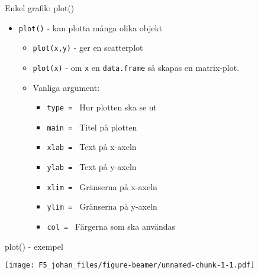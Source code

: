 \documentclass[
  11pt,
  ignorenonframetext,
  handout]{beamer}
\newenvironment{Shaded}{\begin{snugshade}}{\end{snugshade}}
\newcommand{\AttributeTok}[1]{\textcolor[rgb]{0.13,0.29,0.53}{#1}}
\newcommand{\FunctionTok}[1]{\textcolor[rgb]{0.13,0.29,0.53}{\textbf{#1}}}
\newcommand{\NormalTok}[1]{#1}
\newcommand{\SpecialCharTok}[1]{\textcolor[rgb]{0.81,0.36,0.00}{\textbf{#1}}}
\newcommand{\StringTok}[1]{\textcolor[rgb]{0.31,0.60,0.02}{#1}}
\providecommand{\tightlist}{%
  \setlength{\itemsep}{0pt}\setlength{\parskip}{0pt}}
\begin{document}
\begin{frame}{Enkel grafik: plot()}
\label{enkel-grafik-plot}
\begin{itemize}
\tightlist
\item
  \texttt{plot()} - kan plotta många olika objekt

  \begin{itemize}
  \tightlist
  \item
    \texttt{plot(x,y)} - ger en scatterplot
  \item
    \texttt{plot(x)} - om \texttt{x} en \texttt{data.frame} så skapas en
    matrix-plot.
  \item
    Vanliga argument:

    \begin{itemize}
    \tightlist
    \item
      \texttt{type = } Hur plotten ska se ut
    \item
      \texttt{main = } Titel på plotten
    \item
      \texttt{xlab = } Text på x-axeln
    \item
      \texttt{ylab = } Text på y-axeln
    \item
      \texttt{xlim = } Gränserna på x-axeln
    \item
      \texttt{ylim = } Gränserna på y-axeln
    \item
      \texttt{col = } Färgerna som ska användas
    \end{itemize}
  \end{itemize}
\end{itemize}
\end{frame}

\begin{frame}[fragile]{plot() - exempel}
\label{plot---exempel}
\begin{Shaded}
\end{Shaded}

\texttt{[image: F5\_johan\_files/figure-beamer/unnamed-chunk-1-1.pdf]}
\end{frame}
\end{document}
